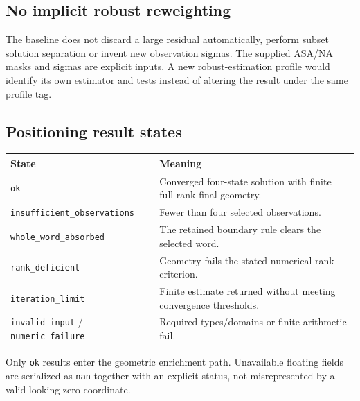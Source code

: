 \documentclass[11pt,a4paper]{article}
\newcommand{\code}[1]{\texttt{#1}}
\begin{document}
\subsection{No implicit robust reweighting}
The baseline does not discard a large residual automatically, perform subset solution separation or invent
new observation sigmas. The supplied ASA/NA masks and sigmas are explicit inputs. A new robust-estimation
profile would identify its own estimator and tests instead of altering the result under the same profile tag.

\subsection{Positioning result states}
\par\small
\begin{tabularx}{\textwidth}{@{}P{.36\textwidth}Y@{}}\toprule
\textbf{State} & \textbf{Meaning}\\\midrule
\code{ok} & Converged four-state solution with finite full-rank final geometry.\\
\code{insufficient\_observations} & Fewer than four selected observations.\\
\code{whole\_word\_absorbed} & The retained boundary rule clears the selected word.\\
\code{rank\_deficient} & Geometry fails the stated numerical rank criterion.\\
\code{iteration\_limit} & Finite estimate returned without meeting convergence thresholds.\\
\code{invalid\_input} / \code{numeric\_failure} & Required types/domains or finite arithmetic fail.\\\bottomrule
\end{tabularx}
\par\normalsize
Only \code{ok} results enter the geometric enrichment path. Unavailable floating fields are serialized as
\code{nan} together with an explicit status, not misrepresented by a valid-looking zero coordinate.
\clearpage
\end{document}

